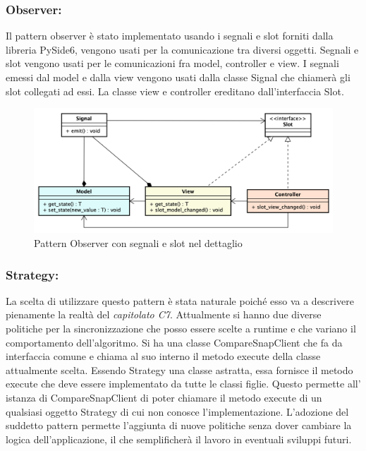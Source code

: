 \subsubsection{Observer:}
Il pattern observer è stato implementato usando i segnali e slot forniti dalla libreria PySide6, vengono usati per la comunicazione tra diversi oggetti.
Segnali e slot vengono usati per le comunicazioni fra model, controller e view. I segnali emessi dal model e dalla view vengono usati dalla classe Signal che chiamerà gli slot collegati ad essi. La classe view e controller ereditano dall'interfaccia Slot.
\begin{figure}[H]
    \centering
    \includegraphics[scale = 0.45]{components/img/observer-implementazione.png}
    \caption{Pattern Observer con segnali e slot nel dettaglio}
    \label{fig:Pattern observer con segnali e slot}
\end{figure}

\subsubsection{Strategy:}
La scelta di utilizzare questo pattern è stata naturale poiché esso va a descrivere pienamente la realtà del \textit{capitolato C7}.\newline{}
Attualmente si hanno due diverse politiche per la sincronizzazione che posso essere scelte a runtime e che variano il comportamento dell'algoritmo. Si ha una classe CompareSnapClient che fa da interfaccia comune e chiama al suo interno il metodo execute della classe attualmente scelta. Essendo Strategy una classe astratta, essa fornisce il metodo execute che deve essere implementato da tutte le classi figlie. Questo permette all' istanza di CompareSnapClient di poter chiamare il metodo execute di un qualsiasi oggetto Strategy di cui non conosce l'implementazione. L'adozione del suddetto pattern permette l'aggiunta di nuove politiche senza dover cambiare la logica dell'applicazione, il che semplificherà il lavoro in eventuali sviluppi futuri.

